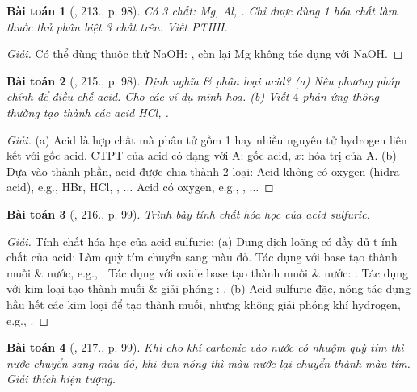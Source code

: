 \documentclass{article}
\newtheorem{baitoan}{Bài toán}
\begin{document}
\begin{baitoan}[\cite{Nguyen_Buu_Can_500_BT_Hoa_Hoc_THCS}, 213., p. 98]
	Có 3 chất: {\rm Mg, Al, }. Chỉ được dùng 1 hóa chất làm thuốc thử phân biệt 3 chất trên. Viết {\rm PTHH}.
\end{baitoan}

\begin{proof}[Giải]
	Có thể dùng thuôc thử NaOH: , còn lại Mg không tác dụng với NaOH.
\end{proof}

\begin{baitoan}[\cite{Nguyen_Buu_Can_500_BT_Hoa_Hoc_THCS}, 215., p. 98]
	Định nghĩa \& phân loại acid? (a) Nêu phương pháp chính để điều chế acid. Cho các ví dụ minh họa. (b) Viết $4$ phản ứng thông thường tạo thành các acid {\rm HCl, }.
\end{baitoan}

\begin{proof}[Giải]
	(a) Acid là hợp chất mà phân tử gồm 1 hay nhiều nguyên tử hydrogen liên kết với gốc acid. CTPT của acid có dạng  với A: gốc acid, $x$: hóa trị của A. (b) Dựa vào thành phần, acid được chia thành 2 loại: Acid không có oxygen (hidra acid), e.g., HBr, HCl, , $\ldots$ Acid có oxygen, e.g., , $\ldots$
\end{proof}

\begin{baitoan}[\cite{Nguyen_Buu_Can_500_BT_Hoa_Hoc_THCS}, 216., p. 99]
	Trình bày tính chất hóa học của acid sulfuric.
\end{baitoan}

\begin{proof}[Giải]
	Tính chất hóa học của acid sulfuric: (a) Dung dịch  loãng có đầy đủ t ính chất của acid: Làm quỳ tím chuyển sang màu đỏ. Tác dụng với base tạo thành muối \& nước, e.g., . Tác dụng với oxide base tạo thành muối \& nước: . Tác dụng với kim loại tạo thành muối \& giải phóng : . (b) Acid sulfuric đặc, nóng tác dụng hầu hết các kim loại để tạo thành muối, nhưng không giải phóng khí hydrogen, e.g., .
\end{proof}

\begin{baitoan}[\cite{Nguyen_Buu_Can_500_BT_Hoa_Hoc_THCS}, 217., p. 99]
	Khi cho khí carbonic vào nước có nhuộm quỳ tím thì nước chuyển sang màu đỏ, khi đun nóng thì màu nước lại chuyển thành màu tím. Giải thích hiện tượng.
\end{baitoan}
\end{document}
